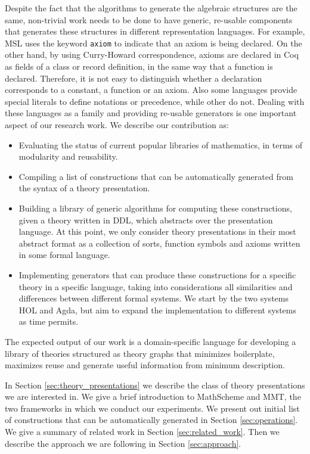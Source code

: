 Despite the fact that the algorithms to generate the algebraic structures are the same, non-trivial work 
needs to be done to have generic, re-usable components that generates these structures in different 
representation languages. For example, MSL uses the keyword \verb|axiom| to indicate that an axiom is 
being declared. On the other hand, by using Curry-Howard correspondence, axioms are declared in 
Coq as fields of a class or record definition, in the same way that a function is declared. Therefore, it is 
not easy to distinguish whether a declaration corresponds to a constant, a function or an axiom. Also 
some languages provide special literals to define notations or precedence, while other do not. Dealing 
with these languages as a family and providing re-usable generators is one important aspect of our 
research work. We describe our contribution as:
\begin{itemize}
	\item Evaluating the status of current popular libraries of mathematics, in terms of modularity and 
	reusability.
	\item Compiling a list of constructions that can be automatically generated from the syntax of a theory presentation. 
	\item Building a library of generic algorithms for computing these constructions, given a theory 
	written in DDL, which abstracts over the presentation language. At this point, we only consider 
	theory presentations in their most abstract format as a collection of sorts, function symbols and 
	axioms written in some formal language.  
	\item Implementing generators that can produce these constructions for a specific theory in a 
	specific language, taking into considerations all similarities and differences between different formal 
	systems. We start by the two systems HOL and Agda, but aim to expand the implementation to 
	different systems as time permits.  
\end{itemize}

The expected output of our work is a domain-specific language for developing a library of theories 
structured as theory graphs that minimizes boilerplate, maximizes reuse and generate useful 
information from minimum description. 

In Section \ref{sec:theory_presentations} we describe the class of theory presentations we are 
interested in. We give a brief introduction to MathScheme and MMT, the two frameworks in which 
we conduct our experiments. We present out initial list of constructions that can be automatically 
generated in Section \ref{sec:operations}. We give a summary of related work in Section 
\ref{sec:related_work}. Then we describe the approach we are following in Section 
\ref{sec:approach}. 

